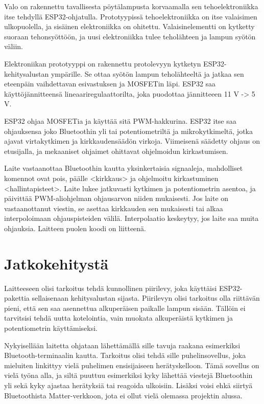 \documentclass{article}
\begin{document}
Valo on rakennettu tavallisesta pöytälampusta korvaamalla sen tehoelektroniikka itse tehdyllä ESP32-ohjatulla. Prototyypissä tehoelektroniikka on itse valaisimen ulkopuolella, ja sisäinen elektroniikka on ohitettu. Valaisinelementti on kytketty suoraan tehonsyöttöön, ja uusi elektroniikka tulee teholähteen ja lampun syötön väliin.

Elektroniikan prototyyppi on rakennettu protolevyyn kytketyn ESP32-kehitysalustan ympärille. Se ottaa syötön lampun teholähteeltä ja jatkaa sen eteenpäin vaihdettavan esivastuksen ja MOSFETin läpi. ESP32 saa käyttöjännitteensä lineaariregulaattorilta, joka puodottaa jännitteeen 11 V -> 5 V.

ESP32 ohjaa MOSFETia ja käyttää sitä PWM-hakkurina. ESP32 itse saa ohjauksensa joko Bluetoothin yli tai potentiometriltä ja mikrokytkimeltä, jotka ajavat virtakytkimen ja kirkkaudensäädön virkoja. Viimeisenä säädetty ohjaus on etusijalla, ja mekaaniset ohjaimet ohittavat ohjelmoidun kirkastumisen.

Laite vastaanottaa Bluetoothin kautta yksinkertaisia signaaleja, mahdolliset komennot ovat pois, päälle <kirkkaus> ja ohjelmoitu kirkastuminen <hallintapisteet>. Laite lukee jatkuvasti kytkimen ja potentiometrin asentoa, ja päivittää PWM-aliohjelman ohjausarvon niiden mukaisesti. Jos laite on vastaanottanut viestin, se asettaa kirkkauden sen mukaisesti tai alkaa interpoloimaan ohjauspisteiden välilä. Interpolaatio keskeytyy, jos laite saa muita ohjauksia. Laitteen puolen koodi on liitteenä.

\newpage
\section*{Jatkokehitystä}

Laitteeseen olisi tarkoitus tehdä kunnollinen piirilevy, joka käyttäisi ESP32-pakettia sellaisenaan kehitysalustan sijasta. Piirilevyn olisi tarkoitus olla riittävän pieni, että sen saa asennettua alkuperäisen paikalle lampun sisään. Tällöin ei tarvitsisi tehdä uutta kotelointia, vain muokata alkuperäistä kytkimen ja potentiometrin käyttämiseksi.

Nykyisellään laitetta ohjataan lähettämällä sille tavuja raakana esimerkiksi Bluetooth-terminaalin kautta. Tarkoitus olisi tehdä sille puhelinsovellus, joka mieluiten linkittyy vielä puhelimen ensisijaiseen herätyskelloon. Tämä sovellus on vielä työna alla, ja siltä puuttuu esimerkiksi kyky lähettää viestejä Bluetoothin yli sekä kyky ajastaa herätyksiä tai reagoida ulkoisiin. Lisäksi voisi ehkä siirtyä Bluetoothista Matter-verkkoon, jota ei ollut vielä olemassa projektin alussa.
\end{document}
